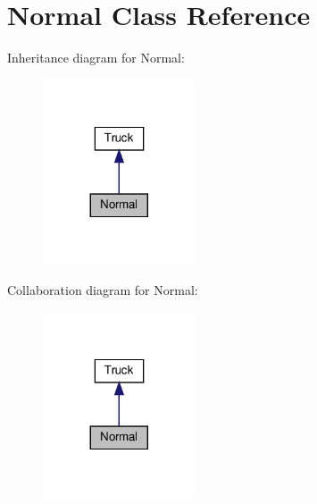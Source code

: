 \hypertarget{class_normal}{}\section{Normal Class Reference}
\label{class_normal}


Inheritance diagram for Normal\+:\nopagebreak
\begin{figure}[H]
\begin{center}
\leavevmode
\includegraphics[width=128pt]{class_normal__inherit__graph}
\end{center}
\end{figure}


Collaboration diagram for Normal\+:\nopagebreak
\begin{figure}[H]
\begin{center}
\leavevmode
\includegraphics[width=128pt]{class_normal__coll__graph}
\end{center}
\end{figure}
